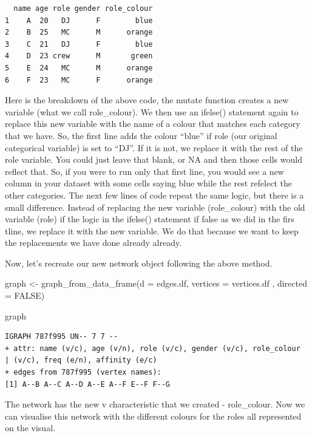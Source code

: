 \documentclass[
  letterpaper,
  DIV=11,
  numbers=noendperiod]{scrreprt}
\newenvironment{Shaded}{\begin{snugshade}}{\end{snugshade}}
\newcommand{\AttributeTok}[1]{\textcolor[rgb]{0.40,0.45,0.13}{#1}}
\newcommand{\ConstantTok}[1]{\textcolor[rgb]{0.56,0.35,0.01}{#1}}
\newcommand{\FunctionTok}[1]{\textcolor[rgb]{0.28,0.35,0.67}{#1}}
\newcommand{\NormalTok}[1]{\textcolor[rgb]{0.00,0.23,0.31}{#1}}
\newcommand{\OtherTok}[1]{\textcolor[rgb]{0.00,0.23,0.31}{#1}}
\begin{document}
\begin{verbatim}
  name age role gender role_colour
1    A  20   DJ      F        blue
2    B  25   MC      M      orange
3    C  21   DJ      F        blue
4    D  23 crew      M       green
5    E  24   MC      M      orange
6    F  23   MC      F      orange
\end{verbatim}

Here is the breakdown of the above code, the mutate function creates a
new variable (what we call role\_colour). We then use an ifelse()
statement again to replace this new variable with the name of a colour
that matches each category that we have. So, the first line adds the
colour ``blue'' if role (our original categorical variable) is set to
``DJ''. If it is not, we replace it with the rest of the role variable.
You could just leave that blank, or NA and then those cells would
reflect that. So, if you were to run only that first line, you would see
a new column in your dataset with some cells saying blue while the rest
refelect the other categories. The next few lines of code repeat the
same logic, but there is a small difference. Instead of replacing the
new variable (role\_colour) with the old variable (role) if the logic in
the ifelse() statement if false as we did in the firs tline, we replace
it with the new variable. We do that because we want to keep the
replacements we have done already already.

Now, let's recreate our new network object following the above method.

\begin{Shaded}
\begin{Highlighting}[]
\NormalTok{graph }\OtherTok{\textless{}{-}} \FunctionTok{graph\_from\_data\_frame}\NormalTok{(}\AttributeTok{d =}\NormalTok{ edges.df, }\AttributeTok{vertices =}\NormalTok{ vertices.df , }\AttributeTok{directed =} \ConstantTok{FALSE}\NormalTok{)}

\NormalTok{graph}
\end{Highlighting}
\end{Shaded}

\begin{verbatim}
IGRAPH 787f995 UN-- 7 7 -- 
+ attr: name (v/c), age (v/n), role (v/c), gender (v/c), role_colour
| (v/c), freq (e/n), affinity (e/c)
+ edges from 787f995 (vertex names):
[1] A--B A--C A--D A--E A--F E--F F--G
\end{verbatim}

The network has the new v characteristic that we created - role\_colour.
Now we can visualise this network with the different colours for the
roles all represented on the visual.
\end{document}
